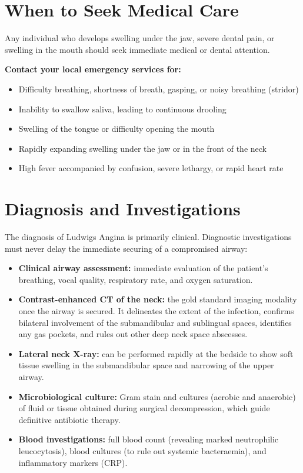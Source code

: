 \section*{When to Seek Medical Care}
Any individual who develops swelling under the jaw, severe dental pain, or swelling in the mouth should seek immediate medical or dental attention.

\textbf{Contact your local emergency services for:}
\begin{itemize}
    \item Difficulty breathing, shortness of breath, gasping, or noisy breathing (stridor)
    \item Inability to swallow saliva, leading to continuous drooling
    \item Swelling of the tongue or difficulty opening the mouth
    \item Rapidly expanding swelling under the jaw or in the front of the neck
    \item High fever accompanied by confusion, severe lethargy, or rapid heart rate
\end{itemize}

\section*{Diagnosis and Investigations}
The diagnosis of Ludwigs Angina is primarily clinical. Diagnostic investigations must never delay the immediate securing of a compromised airway:
\begin{itemize}
    \item \textbf{Clinical airway assessment:} immediate evaluation of the patient's breathing, vocal quality, respiratory rate, and oxygen saturation.
    \item \textbf{Contrast-enhanced CT of the neck:} the gold standard imaging modality once the airway is secured. It delineates the extent of the infection, confirms bilateral involvement of the submandibular and sublingual spaces, identifies any gas pockets, and rules out other deep neck space abscesses.
    \item \textbf{Lateral neck X-ray:} can be performed rapidly at the bedside to show soft tissue swelling in the submandibular space and narrowing of the upper airway.
    \item \textbf{Microbiological culture:} Gram stain and cultures (aerobic and anaerobic) of fluid or tissue obtained during surgical decompression, which guide definitive antibiotic therapy.
    \item \textbf{Blood investigations:} full blood count (revealing marked neutrophilic leucocytosis), blood cultures (to rule out systemic bacteraemia), and inflammatory markers (CRP).
\end{itemize}

